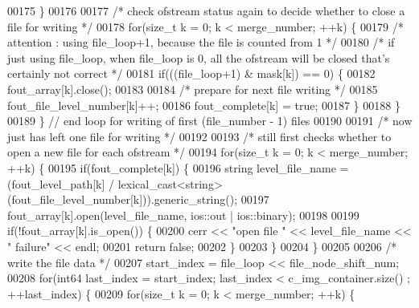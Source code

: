 \begin{DoxyCode}
00175                 \}
00176 
00177                 \textcolor{comment}{/* check ofstream status again to decide whether to close a
       file for writing */}
00178                 \textcolor{keywordflow}{for}(\textcolor{keywordtype}{size\_t} k = 0; k < merge\_number; ++k) \{
00179                         \textcolor{comment}{/* attention : using file\_loop+1, because the file is
       counted from 1 */}
00180                         \textcolor{comment}{/* if just using file\_loop, when file\_loop is 0, all
       the ofstream will be closed that's certainly not correct */}
00181                         \textcolor{keywordflow}{if}(((file\_loop+1) & mask[k]) == 0) \{
00182                                 fout\_array[k].close();
00183 
00184                                 \textcolor{comment}{/* prepare for next file writing */}
00185                                 fout\_file\_level\_number[k]++;
00186                                 fout\_complete[k] = \textcolor{keyword}{true};
00187                         \}
00188                 \}
00189         \} \textcolor{comment}{// end loop for writing of first (file\_number - 1) files}
00190 
00191         \textcolor{comment}{/* now just has left one file for writing */}
00192 
00193         \textcolor{comment}{/* still first checks whether to open a new file for each ofstream */}
00194         \textcolor{keywordflow}{for}(\textcolor{keywordtype}{size\_t} k = 0; k < merge\_number; ++k) \{
00195                 \textcolor{keywordflow}{if}(fout\_complete[k]) \{
00196                         \textcolor{keywordtype}{string} level\_file\_name = (fout\_level\_path[k] / 
      lexical\_cast<\textcolor{keywordtype}{string}>(fout\_file\_level\_number[k])).generic\_string();
00197                         fout\_array[k].open(level\_file\_name, ios::out | 
      ios::binary);
00198 
00199                         \textcolor{keywordflow}{if}(!fout\_array[k].is\_open()) \{
00200                                 cerr << \textcolor{stringliteral}{"open file "} << level\_file\_name << \textcolor{stringliteral}{"
       failure"} << endl;
00201                                 \textcolor{keywordflow}{return} \textcolor{keyword}{false};
00202                         \}
00203                 \}
00204         \}
00205 
00206         \textcolor{comment}{/* write the file data */}
00207         start\_index = file\_loop << file\_node\_shift\_num;
00208         \textcolor{keywordflow}{for}(int64 last\_index = start\_index; last\_index < c\_img\_container.size()
      ; ++last\_index) \{
00209                 \textcolor{keywordflow}{for}(\textcolor{keywordtype}{size\_t} k = 0; k < merge\_number; ++k) \{

\end{DoxyCode}

